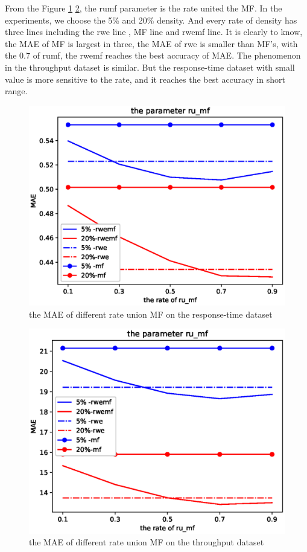\documentclass[conference]{IEEEtran}
\begin{document}
\par From the Figure \ref{fig_rumf_rt} \ref{fig_rumf_tp}, the rumf parameter is the rate united the MF. In the experiments, we choose the 5\% and 20\% density. And every rate of density has three lines including the rwe line , MF line and rwemf line. It is clearly to know, the MAE of MF is largest in three, the MAE of rwe is smaller than MF's, with the 0.7 of rumf, the rwemf reaches the best accuracy of MAE. The phenomenon in the throughput dataset is similar. But the response-time dataset with small value is more sensitive to the rate, and it reaches the best accuracy in short range. 


\begin{figure}[H] 
\centering  
\includegraphics[width=0.45\paperwidth]{rumf_rt.eps}  
\caption{the MAE of different rate union MF on the response-time dataset }  
\label{fig_rumf_rt}  
\end{figure} 

\begin{figure}[H] 
\centering  
\includegraphics[width=0.45\paperwidth]{rumf_tp.eps}  
\caption{the MAE of different rate union MF  on the throughput dataset }  
\label{fig_rumf_tp}  
\end{figure} 
\end{document}
